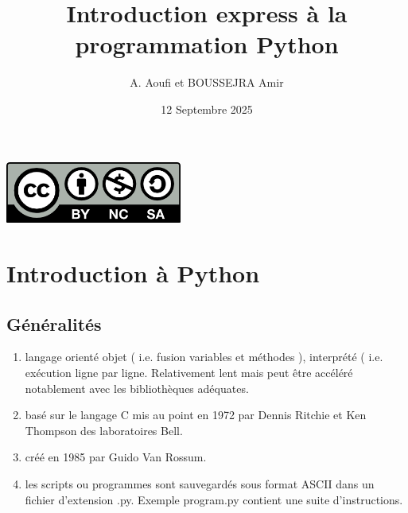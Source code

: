 \documentclass[a4paper,12pt]{article}
\author{A. Aoufi et BOUSSEJRA Amir}
\title{Introduction express \`a la programmation Python}
\date{12 Septembre 2025}
\begin{document}
\maketitle
\begin{center}
\includegraphics[height=0.8in]{./png/licence-by-nc-sa.png}
\end{center}
\clearpage
\tableofcontents

\clearpage
\section{Introduction à Python}
\subsection{G\'en\'eralit\'es}
\begin{enumerate}
\item langage orient\'e objet ( i.e. fusion variables et m\'ethodes ), interpr\'et\'e ( i.e. ex\'ecution ligne par ligne. Relativement lent mais peut \^etre  acc\'el\'er\'e notablement avec les  biblioth\`eques ad\'equates.
\item bas\'e sur le langage C mis au point en 1972 par Dennis Ritchie et Ken Thompson des laboratoires Bell.
\item cr\'e\'e en 1985 par Guido Van Rossum.
\item les scripts ou programmes sont sauvegard\'es sous format ASCII dans un fichier d'extension .py. Exemple program.py contient une suite d'instructions.
\end{enumerate}
\end{document}
